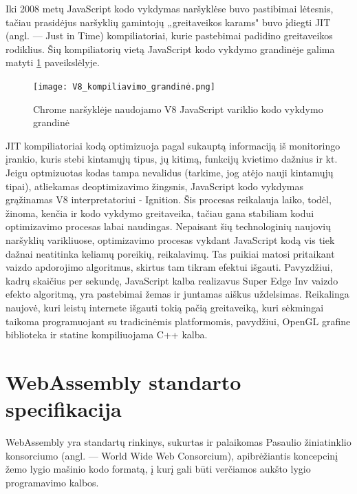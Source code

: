 \documentclass{VUMIFPSkursinis}
\begin{document}
Iki 2008 metų JavaScript kodo vykdymas naršyklėse buvo pastibimai lėtesnis, tačiau prasidėjus naršyklių gamintojų „greitaveikos karams" buvo įdiegti JIT (angl. — Just in Time) kompiliatoriai, kurie pastebimai padidino greitaveikos rodiklius. \cite{DAC17} Šių kompiliatorių vietą JavaScript kodo vykdymo grandinėje galima matyti \ref{fig:v8_pipeline} paveikslėlyje.

\begin{figure}[h!]
  \begin{center}
  \texttt{[image: V8\_kompiliavimo\_grandinė.png]}
  \end{center}
  \caption{Chrome naršyklėje naudojamo V8 JavaScript variklio kodo vykdymo grandinė \cite{HNO19}}
  \label{fig:v8_pipeline}
\end{figure}

JIT kompiliatoriai kodą optimizuoja pagal sukauptą informaciją iš monitoringo įrankio, kuris stebi kintamųjų tipus, jų kitimą, funkcijų kvietimo dažnius ir kt. Jeigu optmizuotas kodas tampa nevalidus (tarkime, jog atėjo nauji kintamųjų tipai), atliekamas deoptimizavimo žingsnis, JavaScript kodo vykdymas grąžinamas V8 interpretatoriui - Ignition. Šis procesas reikalauja laiko, todėl, žinoma, kenčia ir kodo vykdymo greitaveika, tačiau gana stabiliam kodui optimizavimo procesas labai naudingas.
Nepaisant šių technologinių naujovių naršyklių varikliuose, optimizavimo procesas vykdant JavaScript kodą vis tiek dažnai neatitinka keliamų poreikių, reikalavimų. Tas puikiai matosi pritaikant vaizdo apdorojimo algoritmus, skirtus tam tikram efektui išgauti. Pavyzdžiui, kadrų skaičius per sekundę, JavaScript kalba realizavus Super Edge Inv vaizdo efekto algoritmą, yra pastebimai žemas ir juntamas aiškus uždelsimas. \cite{WVE17} Reikalinga naujovė, kuri leistų internete išgauti tokią pačią greitaveiką, kuri sėkmingai taikoma programuojant su tradicinėmis platformomis, pavydžiui, OpenGL grafine biblioteka ir statine kompiliuojama C++ kalba.

\section{WebAssembly standarto specifikacija}

WebAssembly yra standartų rinkinys, sukurtas ir palaikomas Pasaulio žiniatinklio konsorciumo (angl. — World Wide Web Consorcium), apibrėžiantis koncepcinį žemo lygio mašinio kodo formatą, į kurį gali būti verčiamos aukšto lygio programavimo kalbos. \cite{WAS17}
\end{document}
